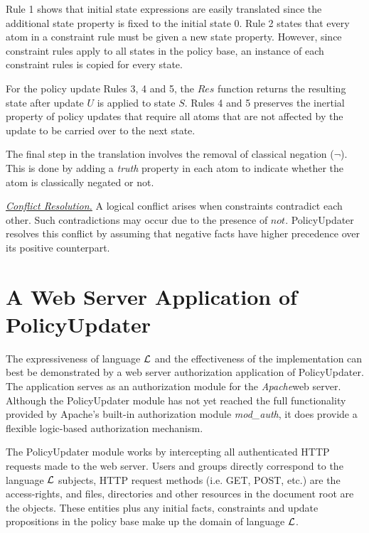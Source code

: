 \documentclass{llncs}
\begin{document}
    Rule 1 shows that initial state expressions are easily translated since
    the additional state property is fixed to the initial state 0. Rule 2
    states that every atom in a constraint rule must be given a new state
    property. However, since constraint rules apply to all states in the
    policy base, an instance of each constraint rules is copied for every
    state.

    For the policy update Rules 3, 4 and 5, the $Res$ function returns
    the resulting state after update $U$ is applied to state $S$. Rules 4 and
    5 preserves the inertial property of policy updates that require all atoms
    that are not affected by the update to be carried over to the next state.

    The final step in the translation involves the removal of classical
    negation ($\lnot$). This is done by adding a \emph{truth} property
    in each atom to indicate whether the atom is classically negated or not.

    \vspace{0.05cm}

    \noindent
    \underline{\emph{Conflict Resolution.}}
    A logical conflict arises when constraints contradict each other. Such
    contradictions may occur due to the presence of $not$. PolicyUpdater
    resolves this conflict by assuming that negative facts have higher
    precedence over its positive counterpart.

  \section{A Web Server Application of PolicyUpdater}

    The expressiveness of language $\cal{L}$ and the effectiveness of the
    implementation can best be demonstrated by a web server authorization
    application of PolicyUpdater. The application serves as an authorization
    module for the \emph{Apache}\footnotemark web server. Although the
    PolicyUpdater module has not yet reached the full functionality provided
    by Apache's built-in authorization module \emph{mod\_auth}, it does provide
    a flexible logic-based authorization mechanism.

    The PolicyUpdater module works by intercepting all authenticated HTTP
    requests made to the web server. Users and groups directly correspond to
    the language $\cal{L}$ subjects, HTTP request methods (i.e. GET, POST,
    etc.) are the access-rights, and files, directories and other resources
    in the document root are the objects. These entities plus any initial
    facts, constraints and update propositions in the policy base make up the
    domain of language $\cal{L}$.
\end{document}
